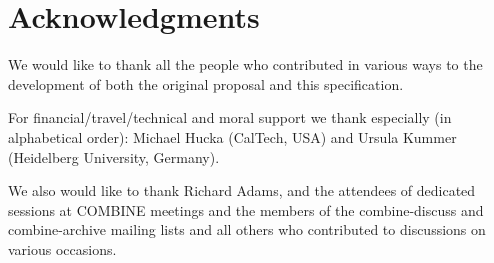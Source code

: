 
\section{Acknowledgments}
 We would like to thank all the people who contributed in various ways 
to the development of both the original proposal and this specification. 

For financial/travel/technical and moral support we thank especially (in 
alphabetical order): Michael Hucka (CalTech, USA) and Ursula Kummer 
(Heidelberg University, Germany). 

We also would like to thank Richard Adams, and the attendees of dedicated 
sessions at COMBINE meetings and the members of the 
\textsf{combine-discuss} and \textsf{combine-archive} mailing lists and all others who contributed to 
discussions on various occasions. 

